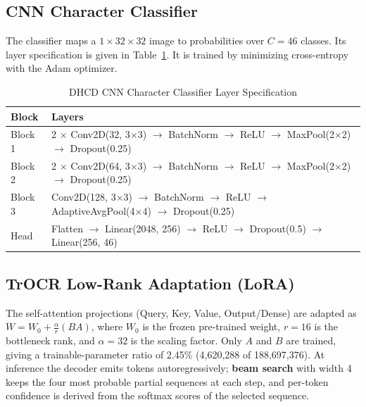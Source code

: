 \documentclass[12pt,a4paper]{report}
\begin{document}
\subsection{CNN Character Classifier}
The classifier maps a $1\times32\times32$ image to probabilities over $C = 46$ classes. Its layer specification is given in Table~\ref{tab:cnnlayers}. It is trained by minimizing cross-entropy with the Adam optimizer.

\begin{table}[htbp]
\centering
\caption{DHCD CNN Character Classifier Layer Specification}
\label{tab:cnnlayers}
\small
\begin{tabular}{p{1.8cm}p{11.5cm}}
\toprule
\textbf{Block} & \textbf{Layers} \\
\midrule
Block 1 & 2 $\times$ Conv2D(32, 3$\times$3) $\rightarrow$ BatchNorm $\rightarrow$ ReLU $\rightarrow$ MaxPool(2$\times$2) $\rightarrow$ Dropout(0.25) \\
Block 2 & 2 $\times$ Conv2D(64, 3$\times$3) $\rightarrow$ BatchNorm $\rightarrow$ ReLU $\rightarrow$ MaxPool(2$\times$2) $\rightarrow$ Dropout(0.25) \\
Block 3 & Conv2D(128, 3$\times$3) $\rightarrow$ BatchNorm $\rightarrow$ ReLU $\rightarrow$ AdaptiveAvgPool(4$\times$4) $\rightarrow$ Dropout(0.25) \\
Head & Flatten $\rightarrow$ Linear(2048, 256) $\rightarrow$ ReLU $\rightarrow$ Dropout(0.5) $\rightarrow$ Linear(256, 46) \\
\bottomrule
\end{tabular}
\end{table}

\subsection{TrOCR Low-Rank Adaptation (LoRA)}
The self-attention projections (Query, Key, Value, Output/Dense) are adapted as $W = W_0 + \frac{\alpha}{r}(BA)$, where $W_0$ is the frozen pre-trained weight, $r = 16$ is the bottleneck rank, and $\alpha = 32$ is the scaling factor. Only $A$ and $B$ are trained, giving a trainable-parameter ratio of 2.45\% (4{,}620{,}288 of 188{,}697{,}376). At inference the decoder emits tokens autoregressively; \textbf{beam search} with width 4 keeps the four most probable partial sequences at each step, and per-token confidence is derived from the softmax scores of the selected sequence.
\end{document}
